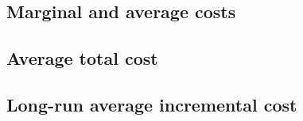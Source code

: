 
\subsection{Marginal and average costs}

\subsection{Average total cost}

\subsection{Long-run average incremental cost}

